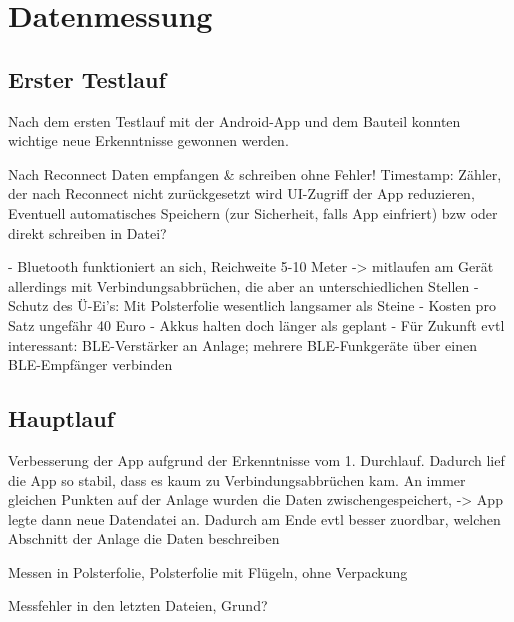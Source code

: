 \section{Datenmessung}

\subsection{Erster Testlauf}
Nach dem ersten Testlauf mit der Android-App und dem Bauteil konnten wichtige neue Erkenntnisse gewonnen werden.


Nach Reconnect Daten empfangen \& schreiben ohne Fehler!
Timestamp: Zähler, der nach Reconnect nicht zurückgesetzt wird
UI-Zugriff der App reduzieren, Eventuell automatisches Speichern (zur Sicherheit, falls App einfriert) bzw oder direkt schreiben in Datei?

-	Bluetooth funktioniert an sich, Reichweite 5-10 Meter -> mitlaufen am Gerät allerdings mit Verbindungsabbrüchen, die aber an unterschiedlichen Stellen
-	Schutz des Ü-Ei’s: Mit Polsterfolie wesentlich langsamer als Steine
-	Kosten pro Satz ungefähr 40 Euro
-	Akkus halten doch länger als geplant
-	Für Zukunft evtl interessant: BLE-Verstärker an Anlage; mehrere BLE-Funkgeräte über einen BLE-Empfänger verbinden



\subsection{Hauptlauf}

Verbesserung der App aufgrund der Erkenntnisse vom 1. Durchlauf. Dadurch lief die App so stabil, dass es kaum zu Verbindungsabbrüchen kam. An immer gleichen Punkten auf der Anlage wurden die Daten zwischengespeichert, -> App legte dann neue Datendatei an. Dadurch am Ende evtl besser zuordbar, welchen Abschnitt der Anlage die Daten beschreiben

Messen in Polsterfolie, Polsterfolie mit Flügeln, ohne Verpackung

Messfehler in den letzten Dateien, Grund?